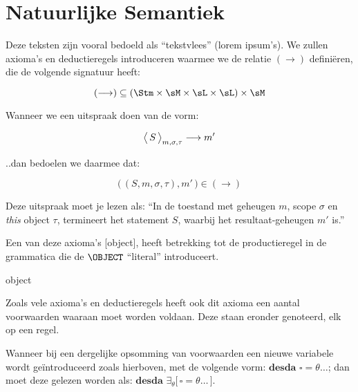
\chapter{Natuurlijke Semantiek}

Deze teksten zijn vooral bedoeld als ``tekstvlees'' (lorem ipsum's). We zullen axioma's en deductieregels introduceren waarmee we de relatie $(\longrightarrow)$ definiëren, die de volgende signatuur heeft:

$$ (\longrightarrow) \subseteq (\Stm \times \sM \times \sL \times \sL) \times \sM $$

Wanneer we een uitspraak doen van de vorm:

$$ \Config{S}{m,\sigma,\tau} \longrightarrow m' $$

..dan bedoelen we daarmee dat:

$$ \big(\,(S,m,\sigma,\tau), m'\,\big) \in (\longrightarrow) $$

Deze uitspraak moet je lezen als: ``In de toestand met geheugen $m$, scope $\sigma$ en \emph{this} object $\tau$, termineert het statement $S$, waarbij het resultaat-geheugen $m'$ is.''

Een van deze axioma's [object], heeft betrekking tot de productieregel in de grammatica die de $\OBJECT$ ``literal'' introduceert.

\begin{NSAxiom}{object}
  \begin{prooftree}
  \end{prooftree}
  \begin{NSConditions}
  \end{NSConditions}
\end{NSAxiom}

Zoals vele axioma's en deductieregels heeft ook dit axioma een aantal voorwaarden waaraan moet worden voldaan. Deze staan eronder genoteerd, elk op een regel.

Wanneer bij een dergelijke opsomming van voorwaarden een nieuwe variabele wordt geïntroduceerd zoals hierboven, met de volgende vorm: $\textbf{desda } \square = \theta \dots$; dan moet deze gelezen worden als: $\textbf{desda } \exists_\theta \big[\, \square = \theta \dots \,\big]$.

